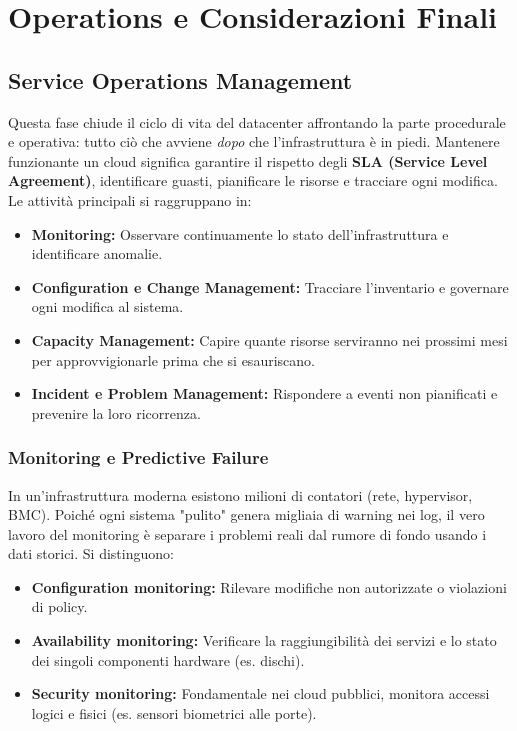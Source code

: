 \chapter{Operations e Considerazioni Finali}

\section{Service Operations Management}
Questa fase chiude il ciclo di vita del datacenter affrontando la parte procedurale e operativa: tutto ciò che avviene \textit{dopo} che l'infrastruttura è in piedi. Mantenere funzionante un cloud significa garantire il rispetto degli \textbf{SLA (Service Level Agreement)}, identificare guasti, pianificare le risorse e tracciare ogni modifica.
Le attività principali si raggruppano in:
\begin{itemize}
    \item \textbf{Monitoring:} Osservare continuamente lo stato dell'infrastruttura e identificare anomalie.
    \item \textbf{Configuration e Change Management:} Tracciare l'inventario e governare ogni modifica al sistema.
    \item \textbf{Capacity Management:} Capire quante risorse serviranno nei prossimi mesi per approvvigionarle prima che si esauriscano.
    \item \textbf{Incident e Problem Management:} Rispondere a eventi non pianificati e prevenire la loro ricorrenza.
\end{itemize}

\subsection{Monitoring e Predictive Failure}
In un'infrastruttura moderna esistono milioni di contatori (rete, hypervisor, BMC). Poiché ogni sistema "pulito" genera migliaia di warning nei log, il vero lavoro del monitoring è separare i problemi reali dal rumore di fondo usando i dati storici.
Si distinguono:
\begin{itemize}
    \item \textbf{Configuration monitoring:} Rilevare modifiche non autorizzate o violazioni di policy.
    \item \textbf{Availability monitoring:} Verificare la raggiungibilità dei servizi e lo stato dei singoli componenti hardware (es. dischi).
    \item \textbf{Security monitoring:} Fondamentale nei cloud pubblici, monitora accessi logici e fisici (es. sensori biometrici alle porte).
\end{itemize}

